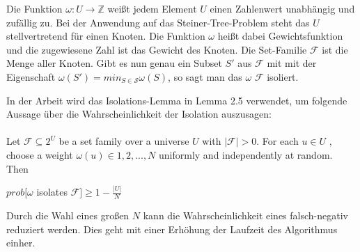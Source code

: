 Die Funktion $\omega : U \rightarrow \mathbb{Z}$ weißt jedem Element $U$ einen Zahlenwert unabhängig und zufällig zu.
Bei der Anwendung auf das Steiner-Tree-Problem steht das $U$ stellvertretend für einen Knoten.
Die Funktion $\omega$ heißt dabei Gewichtsfunktion und die zugewiesene Zahl ist das Gewicht des Knoten.
Die Set-Familie $\mathcal{F}$ ist die Menge aller Knoten.
Gibt es nun genau ein Subset $S'$ aus $\mathcal{F}$ mit mit der Eigenschaft $\omega (S')=min_{S \in \mathcal{S}} \omega(S)$, so sagt man das $\omega$ $\mathcal{F}$ isoliert.

In der Arbeit \cite{cygan_solving_2011} wird das Isolations-Lemma in Lemma 2.5 verwendet, um folgende Aussage über die Wahrscheinlichkeit der Isolation auszusagen:\\
\\Let $\mathcal{F} \subseteq 2^U$ be a set family over a universe $U$ with $|\mathcal{F}| > 0$. For each $u \in U$ ,
choose a weight $\omega(u) \in {1, 2, . . . , N }$ uniformly and independently at random. Then
\begin{center}
$prob[\omega$ isolates $\mathcal{F}]\geq 1 - \frac{|U|}{N}$
\end{center}

Durch die Wahl eines großen $N$ kann die Wahrscheinlichkeit eines falsch-negativ reduziert werden. Dies geht mit einer Erhöhung der Laufzeit des Algorithmus einher.
